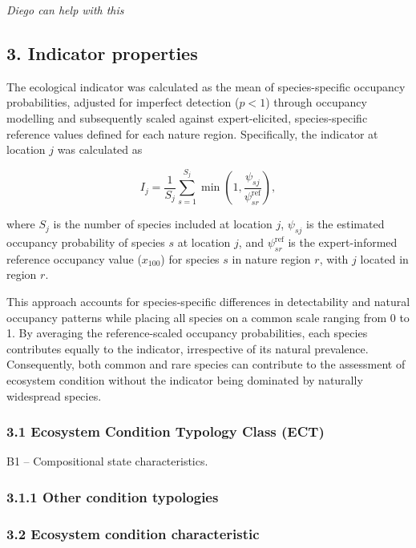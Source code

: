 \documentclass[
  letterpaper,
  DIV=11,
  numbers=noendperiod]{scrartcl}
\begin{document}
\emph{Diego can help with this}

\subsection{3. Indicator properties}\label{indicator-properties}

The ecological indicator was calculated as the mean of species-specific
occupancy probabilities, adjusted for imperfect detection (\(p < 1\))
through occupancy modelling and subsequently scaled against
expert-elicited, species-specific reference values defined for each
nature region. Specifically, the indicator at location \(j\) was
calculated as

\[
I_j = \frac{1}{S_j}\sum_{s=1}^{S_j} \min\left(1,\frac{\psi_{sj}}{\psi^{\mathrm{ref}}_{sr}}\right),
\]

where \(S_j\) is the number of species included at location \(j\),
\(\psi_{sj}\) is the estimated occupancy probability of species \(s\) at
location \(j\), and \(\psi^{\mathrm{ref}}_{sr}\) is the expert-informed
reference occupancy value (\(x_{100}\)) for species \(s\) in nature
region \(r\), with \(j\) located in region \(r\).

This approach accounts for species-specific differences in detectability
and natural occupancy patterns while placing all species on a common
scale ranging from 0 to 1. By averaging the reference-scaled occupancy
probabilities, each species contributes equally to the indicator,
irrespective of its natural prevalence. Consequently, both common and
rare species can contribute to the assessment of ecosystem condition
without the indicator being dominated by naturally widespread species.

\subsubsection{3.1 Ecosystem Condition Typology Class
(ECT)}\label{ecosystem-condition-typology-class-ect}

B1 -- Compositional state characteristics.

\subsubsection{3.1.1 Other condition
typologies}\label{other-condition-typologies}

\subsubsection{3.2 Ecosystem condition
characteristic}\label{ecosystem-condition-characteristic}
\end{document}
